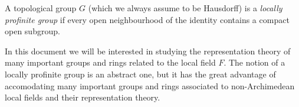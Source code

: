 \begin{defn}\label{loc_prof_grp}
    A topological group $G$ (which we always assume to be Hausdorff) is a \textit{locally profinite group} if every open neighbourhood of the identity contains a compact open subgroup. 
\end{defn}

In this document we will be interested in studying the representation theory of many important groups and rings related to the local field $F$. The notion of a locally profinite group is an abstract one, but it has the great advantage of accomodating many important groups and rings associated to non-Archimedean local fields and their representation theory.

\begin{examples} \label{example_prof_groups}


\end{examples}
